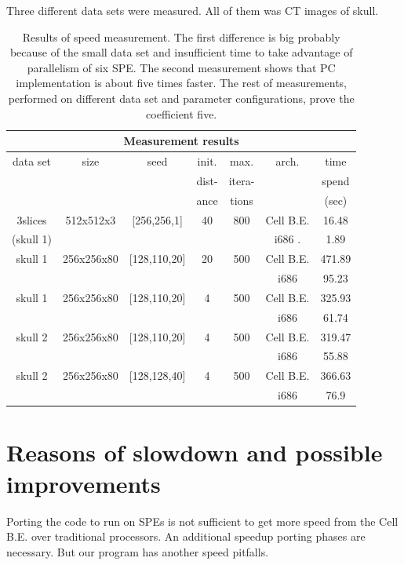 Three different data sets were measured.
All of them was CT images of skull.

\begin{table}
\centering
\begin{tabular}{|c|c|c|c|c|c|c|}
\hline
\multicolumn{7}{|c|}{Measurement results}\\
\hline
data set		&size		&seed		&init.		&max. 		&arch.		&time\\
			&		&		&dist-		&itera-		&		&spend\\
			&		&		&ance		&tions		&		&(sec)\\
\hline
\hline
3slices 		&512x512x3	&[256,256,1]	&40		&800		&Cell B.E.	&16.48\\
(skull 1)		&		&		&		&		&i686	.	&1.89\\
\hline
\hline
skull 1			&256x256x80	&[128,110,20]	&20		&500		&Cell B.E.	&471.89\\
			&		&		&		&		&i686		&95.23\\
\hline
\hline
skull 1			&256x256x80	&[128,110,20]	&4		&500		&Cell B.E.	&325.93\\
			&		&		&		&		&i686		&61.74\\
\hline
\hline
skull 2			&256x256x80	&[128,110,20]	&4		&500		&Cell B.E.	&319.47\\
			&		&		&		&		&i686		&55.88\\
\hline
\hline
skull 2			&256x256x80	&[128,128,40]	&4		&500		&Cell B.E.	&366.63\\
			&		&		&		&		&i686		&76.9\\
\hline
\end{tabular}
\par
\caption[Measurement results]
{
Results of speed measurement.
The first difference is big probably because of the small data set and insufficient time to take advantage of parallelism of six SPE.
The second measurement shows that PC implementation is about five times faster.
The rest of measurements, performed on different data set and parameter configurations, prove the coefficient five.
}
\label{tab:runresults}
\end{table}

\section{Reasons of slowdown and possible improvements}

\par
Porting the code to run on SPEs is not sufficient to get more speed from the Cell B.E. over traditional processors.
An additional speedup porting phases are necessary.
But our program has another speed pitfalls.

